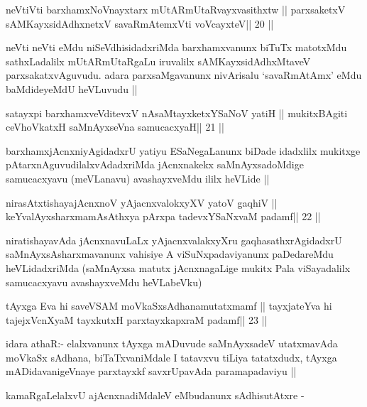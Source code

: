 \begin{shl}
neVtiVti barxhamxNoV\s nayxtarx mUtARmUtaRvayxvasithxtw ||
parxsaketxV sAMKayxsidAdhxnetxV savaRmAtemxVti voVcayxteV\hfill || 20 ||
\end{shl}

\begin{artha}
neVti neVti eMdu niSeVdhisidadxriMda barxhamxvanunx biTuTx matotxMdu
sathxLadalilx mUtARmUtaRgaLu iruvalilx sAMKayxsidAdhxMtaveV
parxsakatxvAguvudu. adara parxsaMgavanunx nivArisalu `savaRmAtAmx'
eMdu baMdideyeMdU heVLuvudu ||
\end{artha}


\begin{shl}
satayxpi barxhamxveVditevxV nAsaMtayxketxYSaNoV yatiH ||
mukitxBAgiti ceVhoVkatxH saMnAyxseVna samucacxyaH\hfill || 21 ||
\end{shl}

\begin{artha}
barxhamxjAcnxniyAgidadxrU yatiyu ESaNegaLanunx biDade idadxlilx
mukitxge pAtarxnAguvudilalxvAdadxriMda jAcnxnakekx saMnAyxsadoMdige
samucacxyavu (meVLanavu) avashayxveMdu ililx heVLide ||
\end{artha}

\begin{shl}
nirasAtxtishayajAcnxnoV yAjacnxvalokxyXV yatoV gaqhiV ||
keYvalAyxsharxmamAsAthxya pArxpa tadevxYSaNxvaM padamf\hfill || 22 ||
\end{shl}

\begin{artha}
niratishayavAda jAcnxnavuLaLx yAjacnxvalakxyXru gaqhasathxrAgidadxrU
saMnAyxsAsharxmavanunx vahisiye A viSuNxpadaviyanunx paDedareMdu
heVLidadxriMda (saMnAyxsa matutx jAcnxnagaLige mukitx Pala
viSayadalilx samucacxyavu avashayxveMdu heVLabeVku)
\end{artha}


\begin{shl}
tAyxga Eva hi saveVSAM moVkaSxsAdhanamutatxmamf ||
tayxjateYva hi tajejxVcnXyaM tayxkutxH parxtayxkapxraM padamf\hfill || 23 ||
\end{shl}

\begin{artha}
idara athaR:- elalxvanunx tAyxga mADuvude saMnAyxsadeV utatxmavAda
moVkaSx sAdhana, biTaTxvaniMdale I tatavxvu tiLiya tatatxdudx, tAyxga
mADidavanigeVnaye parxtayxkf savxrUpavAda paramapadaviyu ||

kamaRgaLelalxvU ajAcnxnadiMdaleV eMbudanunx sAdhisutAtxre -
\end{artha}


